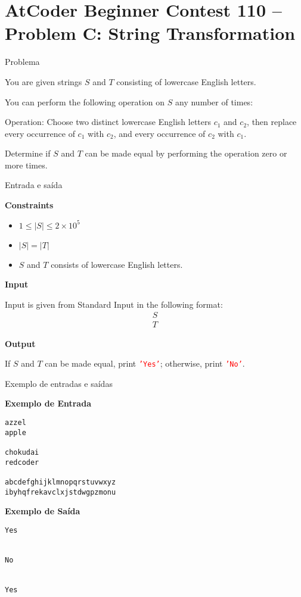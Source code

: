 \section{AtCoder Beginner Contest 110 -- Problem C: String Transformation}

\begin{frame}[fragile]{Problema}

You are given strings $S$ and $T$ consisting of lowercase English letters.

You can perform the following operation on $S$ any number of times:

Operation: Choose two distinct lowercase English letters $c_1$ and $c_2$, then replace every 
occurrence of $c_1$ with $c_2$, and every occurrence of $c_2$ with $c_1$.

Determine if $S$ and $T$
 can be made equal by performing the operation zero or more times.
\end{frame}

\begin{frame}[fragile]{Entrada e saída}

\textbf{Constraints}

\begin{itemize}
    \item $1\leq |S| \leq 2\times 10^5$
    \item $|S| = |T|$
    \item $S$ and $T$ consists of lowercase English letters.
\end{itemize}

\textbf{Input}

Input is given from Standard Input in the following format:
\begin{align*}
S \\
T
\end{align*}

\textbf{Output}

If $S$ and $T$ can be made equal, print \texttt{\textcolor{red}{'Yes'}}; otherwise, print 
\texttt{\textcolor{red}{'No'}}.

\end{frame}

\begin{frame}[fragile]{Exemplo de entradas e saídas}

\begin{minipage}[t]{0.5\textwidth}
\textbf{Exemplo de Entrada}
\begin{verbatim}
azzel
apple

chokudai
redcoder

abcdefghijklmnopqrstuvwxyz
ibyhqfrekavclxjstdwgpzmonu
\end{verbatim}
\end{minipage}
\begin{minipage}[t]{0.45\textwidth}
\textbf{Exemplo de Saída}
\begin{verbatim}
Yes


No


Yes
\end{verbatim}
\end{minipage}
\end{frame}

